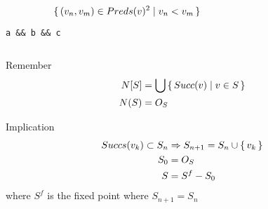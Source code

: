 \documentclass[xcolor = {dvipsnames, table}]{beamer}
\begin{document}
\begin{frame}[fragile]
    \begin{columns}
        \begin{column}{0.5\textwidth}
            \centering
            \begin{equation*}
                \set{(v_n, v_m) \in Preds(v)^2 \mid v_n < v_m}
            \end{equation*}
            \lstinline{a && b && c}
        \end{column}

        \begin{column}{0.5\textwidth}
        \end{column}
    \end{columns}
\end{frame}

\begin{frame}
    \begin{block}{Remember}
        \begin{align*}
            N[S] &= \bigcup \set{Succ(v) \mid v \in S} \\
            N(S) &= O_S \\
        \end{align*}
    \end{block}
    \begin{block}{Implication}
        \begin{align*}
            Succs(v_k) \subset S_n & \Rightarrow S_{n+1} = S_n \cup
            \set{v_k} \\
            S_0 &= O_S \\
            S   &= S^f - S_0 \\
        \end{align*}
        where $S^f$ is the fixed point where $S_{n+1} = S_n$
    \end{block}
\end{frame}
\end{document}
